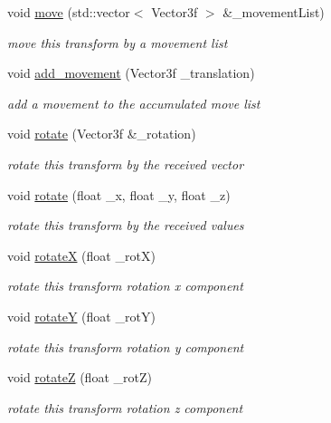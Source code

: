\begin{DoxyCompactItemize}
void \mbox{\hyperlink{classbanita_1_1_transform___component_a5e0fa58446fb78788c12b64e37b1e32a}{move}} (std\+::vector$<$ Vector3f $>$ \&\+\_\+movement\+List)
\begin{DoxyCompactList}\small\item\em move this transform by a movement list \end{DoxyCompactList}\item 
void \mbox{\hyperlink{classbanita_1_1_transform___component_a71e4e16cdbd98c641389455b455ceb01}{add\+\_\+movement}} (Vector3f \+\_\+translation)
\begin{DoxyCompactList}\small\item\em add a movement to the accumulated move list \end{DoxyCompactList}\item 
void \mbox{\hyperlink{classbanita_1_1_transform___component_abbcce56f6a091161a8ab5e83499282f0}{rotate}} (Vector3f \&\+\_\+rotation)
\begin{DoxyCompactList}\small\item\em rotate this transform by the received vector \end{DoxyCompactList}\item 
void \mbox{\hyperlink{classbanita_1_1_transform___component_a4def5a4bcc460815fbfede39643bd08e}{rotate}} (float \+\_\+x, float \+\_\+y, float \+\_\+z)
\begin{DoxyCompactList}\small\item\em rotate this transform by the received values \end{DoxyCompactList}\item 
void \mbox{\hyperlink{classbanita_1_1_transform___component_a05644620f98e07a01f0222182ec5c2f3}{rotateX}} (float \+\_\+rotX)
\begin{DoxyCompactList}\small\item\em rotate this transform rotation x component \end{DoxyCompactList}\item 
void \mbox{\hyperlink{classbanita_1_1_transform___component_a627cc373a6e3d2f9067d9380c272c9cc}{rotateY}} (float \+\_\+rotY)
\begin{DoxyCompactList}\small\item\em rotate this transform rotation y component \end{DoxyCompactList}\item 
void \mbox{\hyperlink{classbanita_1_1_transform___component_a36eeb4e9eb4d7dfd3fc2e07f650ea70c}{rotateZ}} (float \+\_\+rotZ)
\begin{DoxyCompactList}\small\item\em rotate this transform rotation z component \end{DoxyCompactList}\item 

\end{DoxyCompactItemize}
